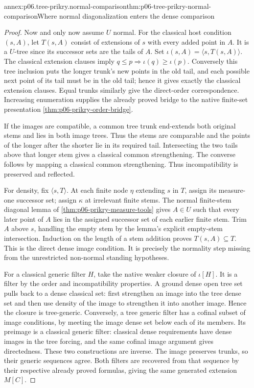 \begin{annexitem}{annex:p06.tree-prikry.normal-comparison}{thm:p06-tree-prikry-normal-comparison}{Where normal diagonalization enters the dense comparison}
\begin{proof}
Now and only now assume \(U\) normal. For the classical host condition
\((s,A)\), let \(T(s,A)\) consist of extensions of \(s\) with every
added point in \(A\). It is a \(U\)-tree since its successor sets
are the tails of \(A\). Set \(\iota(s,A)=\langle s,T(s,A)\rangle\).
The classical extension clauses imply
\(q\leq p\Rightarrow\iota(q)\geq\iota(p)\). Conversely this tree
inclusion puts the longer trunk's new points in the old tail, and each
possible next point of its tail must be in the old tail; hence it gives
exactly the classical extension clauses. Equal trunks similarly give
the direct-order correspondence. Increasing enumeration supplies the
already proved bridge to the native finite-set presentation
\cref{thm:p06-prikry-order-bridge}.

If the images are compatible, a common tree trunk end-extends both
original stems and lies in both image trees. Thus the stems are comparable
and the points of the longer after the shorter lie in its required tail.
Intersecting the two tails above that longer stem gives a classical
common strengthening. The converse follows by mapping a classical
common strengthening. Thus incompatibility is preserved and reflected.

For density, fix \(\langle s,T\rangle\). At each finite node \(\eta\)
extending \(s\) in \(T\), assign its measure-one successor set;
assign \(\kappa\) at irrelevant finite stems. The normal finite-stem
diagonal lemma of \cref{thm:p06-prikry-measure-tools} gives \(A\in U\)
such that every later point of \(A\) lies in the assigned successor
set of each earlier finite stem. Trim \(A\) above \(s\), handling
the empty stem by the lemma's explicit empty-stem intersection. Induction
on the length of a stem addition proves \(T(s,A)\subseteq T\).
This is the direct dense image condition. It is precisely the normality
step missing from the unrestricted non-normal standing hypotheses.

For a classical generic filter \(H\), take the native weaker closure
of \(\iota[H]\). It is a filter by the order and incompatibility
properties. A ground dense open tree set pulls back to a dense classical
set: first strengthen an image into the tree dense set and then use
density of the image to strengthen it into another image. Hence the
closure is tree-generic. Conversely, a tree generic filter has a cofinal
subset of image conditions, by meeting the image dense set below each
of its members. Its preimage is a classical generic filter: classical
dense requirements have dense images in the tree forcing, and the same
cofinal image argument gives directedness. These two constructions are
inverse. The image preserves trunks, so their generic sequences agree.
Both filters are recovered from that sequence by their respective
already proved formulas, giving the same generated extension \(M[C]\).


\end{proof}
\end{annexitem}
